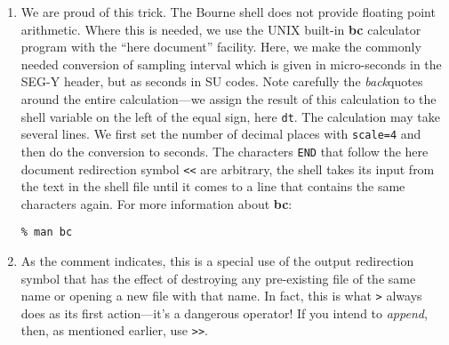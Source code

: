 {{{{{{{\begin{enumerate}
{\begin{verbatim}
 tracl=2            ns=64       

 tracl=3            ns=64       

 tracl=4            ns=64       

 tracl=5            ns=64       

 tracl=6            ns=64    
   
 ...
\end{verbatim}}\noindent
Although {\bf sugethw} is eager to give the values for every trace in the
data set, we only need it once.  The solution is to use the UNIX stream
editor ({\bf sed}).  In fact, we use it twice.  By default, {\bf sed} passes
along its input to its output.  Our first use is merely to tell {\bf sed}
to quit after it puts the first line in the pipe.  The second pass through
{\bf sed} strips off the unwanted material before the integer.
In detail, the second {\bf sed} command reads: replace (or substitute)
everything up to the characters \verb:ns=: with nothing, i.e., delete
those characters.


\item We are proud of this trick.
The Bourne shell does not provide floating point
arithmetic.  Where this is needed, we use the UNIX built-in
{\bf bc} calculator program with the ``here document'' facility.
Here, we make the commonly needed conversion of sampling interval which
is given in micro-seconds in the {\sf SEG-Y} header,
but as seconds in {\small\sf SU} codes.  Note carefully the {\em back}quotes
around the entire calculation---we assign the result of this
calculation to the shell variable on the left of the equal sign,
here \verb:dt:.  The calculation may take several lines.
We first set the number of decimal places with \verb:scale=4:
and then do the conversion to seconds.  The characters \verb:END:
that follow the here document redirection symbol \verb:<<: are arbitrary,
the shell takes its input from the text in the shell file
until it comes to a line that contains the same
characters again.  For more information about {\bf bc}:
{\small\begin{verbatim}
% man bc
\end{verbatim}}\noindent

\item As the comment indicates, this is a special use of the output
redirection symbol that has the effect of destroying any pre-existing
file of the same name or opening a new file with that name.  In fact,
this is what \verb:>: always does as its first action---it's a dangerous
operator!  If you intend to {\em append}, then, as mentioned earlier, use
\verb:>>:.


\end{enumerate}}}}}}}}
